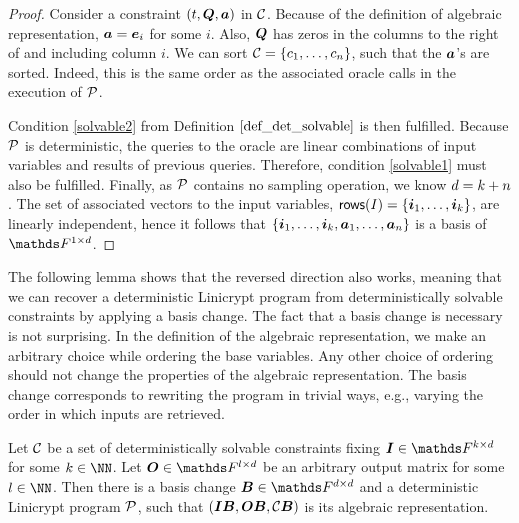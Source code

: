 \begin{proof}
    Consider a constraint $(t, \Q, \va)$ in $\C$.
    Because of the definition of algebraic representation, $\va = \ve_i$ for some $i$.
    Also, $\Q$ has zeros in the columns to the right of and including column $i$.
    We can sort $\C = \{\dts c n\}$, such that the $\va$'s are sorted.
    Indeed, this is the same order as the associated oracle calls in the execution of $\P$.
    
    Condition \ref{solvable2} from Definition $\ref{def_det_solvable}$ is then fulfilled.
    Because $\P$ is deterministic, 
    the queries to the oracle are linear combinations of input variables and results of previous queries.
    Therefore, condition \ref{solvable1} must also be fulfilled.
    Finally, as $\P$ contains no sampling operation, we know $\base = k + n$.
    The set of associated vectors to the input variables, $\rows(I) = \{ \dts \vi k \}$, are linearly independent,
    hence it follows that $\{ \dts \vi k, \dts \va n \}$ is a basis of $\Frowsp$. 
\end{proof}

The following lemma shows that the reversed direction also works,
meaning that we can recover a deterministic Linicrypt program from deterministically solvable constraints by applying a basis change.
The fact that a basis change is necessary is not surprising.
In the definition of the algebraic representation,
we make an arbitrary choice while ordering the base variables.
Any other choice of ordering should not change the properties of the algebraic representation.
The basis change corresponds to rewriting the program in trivial ways,
e.g., varying the order in which inputs are retrieved.

\begin{lemma}
\label{det_solvable_lemma}
    Let $\C$ be a set of deterministically solvable constraints fixing $\Inp \in \F^{k \times \base}$ for some $k \in \NN$.
    Let $\O \in \F^{l \times \base}$ be an arbitrary output matrix for some $l \in \NN$.
    Then there is a basis change $\B \in \F^{\base \times \base}$
    and a deterministic Linicrypt program $\P$,
    such that $(\Inp \B, \O \B, \C \B)$ is its algebraic representation.
\end{lemma}

